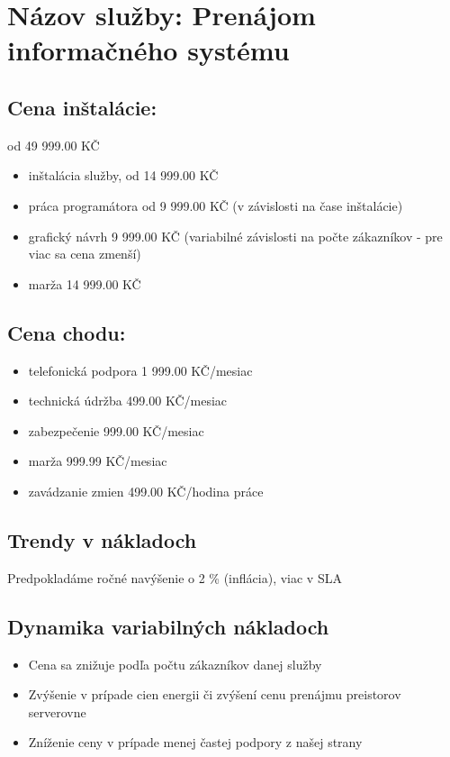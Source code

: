 \documentclass[a4paper, 11pt]{article}
\begin{document}
\section*{Názov služby: Prenájom informačného systému}
\subsection*{Cena inštalácie:} od 49 999.00 KČ
\begin{itemize}
\item inštalácia služby, od 14 999.00 KČ
\item práca programátora od 9 999.00 KČ (v závislosti na čase inštalácie)
\item grafický návrh 9 999.00 KČ (variabilné závislosti na počte zákazníkov - pre viac sa cena zmenší)
\item marža 14 999.00 KČ
\end{itemize}
\subsection*{Cena chodu:}
\begin{itemize}
\item telefonická podpora 1 999.00 KČ/mesiac
\item technická údržba 499.00 KČ/mesiac
\item zabezpečenie 999.00 KČ/mesiac
\item marža 999.99 KČ/mesiac
\item zavádzanie zmien 499.00 KČ/hodina práce
\end{itemize}

\subsection*{Trendy v nákladoch}
Predpokladáme ročné navýšenie o 2 \% (inflácia), viac v SLA

\subsection*{Dynamika variabilných nákladoch}
\begin{itemize}
\item Cena sa znižuje podľa počtu zákazníkov danej služby
\item Zvýšenie v prípade cien energii či zvýšení cenu prenájmu preistorov serverovne
\item Zníženie ceny v prípade menej častej podpory z našej strany
\end{itemize}
\end{document}
